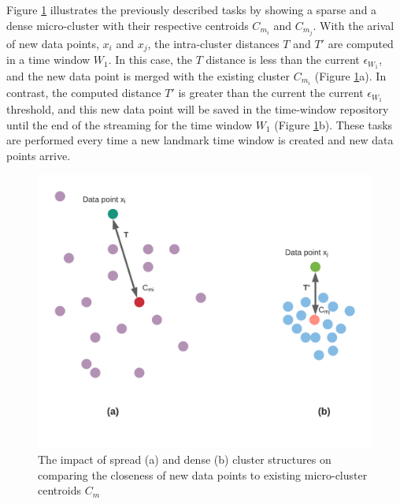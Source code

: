 Figure \ref{thr} illustrates the previously described tasks by showing a sparse and a dense micro-cluster with their respective centroids $C_{m_i}$ and $C_{m_j}$. With the arival of new data points, $x_i$ and $x_j$, the intra-cluster distances $T$ and $T'$ are computed in a time window $W_1$. In this case, the $T$ distance is less than the current $\epsilon_{W_1}$, and the new data point is merged with the existing cluster $C_{m_i}$ (Figure \ref{thr}a). In contrast, the computed distance $T'$ is greater than the current the current $\epsilon_{W_1}$ threshold, and this new data point will be saved in the time-window repository until the end of the streaming for the time window $W_1$ (Figure \ref{thr}b). These tasks are performed every time a new landmark time window is created and new data points arrive.
     
    \begin{figure}[!ht]
    \centering
    \includegraphics[width = 11 cm]{image/Chapters/Chapter4/threshold.png}
    \caption{The impact of spread (a) and dense (b) cluster structures on comparing the closeness of new data points to existing micro-cluster centroids $C_m$ } 
    \label{thr}
    \end{figure}

